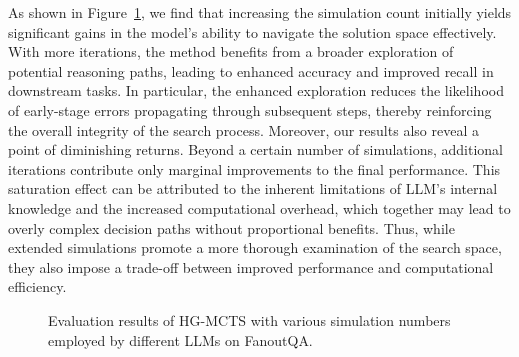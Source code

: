As shown in Figure~\ref{fig:simulation}, we find that increasing the simulation count initially yields significant gains in the model’s ability to navigate the solution space effectively. With more iterations, the method benefits from a broader exploration of potential reasoning paths, leading to enhanced accuracy and improved recall in downstream tasks. In particular, the enhanced exploration reduces the likelihood of early-stage errors propagating through subsequent steps, thereby reinforcing the overall integrity of the search process.
Moreover, our results also reveal a point of diminishing returns. Beyond a certain number of simulations, additional iterations contribute only marginal improvements to the final performance. This saturation effect can be attributed to the inherent limitations of LLM's internal knowledge and the increased computational overhead, which together may lead to overly complex decision paths without proportional benefits. Thus, while extended simulations promote a more thorough examination of the search space, they also impose a trade-off between improved performance and computational efficiency.



\begin{figure}[t!]
    \centering
    \caption{Evaluation results of HG-MCTS with various simulation numbers employed by different LLMs on FanoutQA.}
    \label{fig:simulation}
\end{figure}